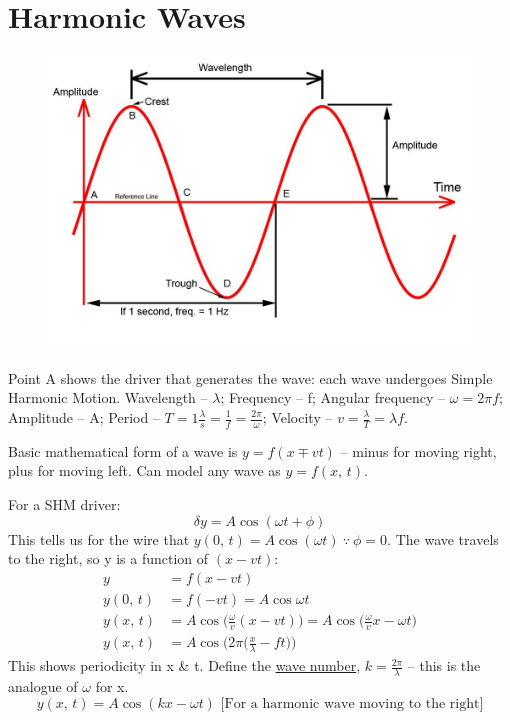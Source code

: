 \documentclass[a4paper, 11pt, normalem]{report}
\begin{document}
\section{Harmonic Waves}
\begin{figure}[H]
    \centering
    \includegraphics[scale=0.3]{Sine.jpg}
\end{figure}
Point A shows the driver that generates the wave: each wave undergoes Simple Harmonic Motion.
Wavelength -- $\lambda$; Frequency -- f; Angular frequency -- $\omega = 2{\pi}f$; Amplitude -- A; Period -- $T = 1 \frac{\lambda}{s} = \frac{1}{f} = \frac{2\pi}{\omega}$; Velocity -- $v = \frac{\lambda}{T} = {\lambda}f$.

Basic mathematical form of a wave is $y = f(x \mp vt)$ -- minus for moving right, plus for moving left.
Can model any wave as $y = f(x,\,t)$.

For a SHM driver:
\begin{equation}
    {\delta}y = A\cos{({\omega}t + \phi)}
\end{equation}
This tells us for the wire that $y(0,\,t) = A\cos{({\omega}t)} ~\because~ \phi = 0$.
The wave travels to the right, so y is a function of $(x-vt)$:
\begin{align}
    y &= f(x-vt) \\
    y(0,\,t) &= f(-vt) = A\cos{{\omega}t} \\
    y(x,\,t) &= A\cos{\Big(\frac{\omega}{v}(x-vt)\Big)} = A\cos{\Big(\frac{\omega}{v}x - {\omega}t\Big)} \\
    y(x,\,t) &= A\cos{\Big(2\pi\Big(\frac{x}{\lambda} - ft\Big)\Big)}
\end{align}
This shows periodicity in x \& t.
Define the \underline{wave number}, $k = \frac{2\pi}{\lambda}$ -- this is the analogue of $\omega$ for x.
\begin{equation}
    y(x,\,t) = A\cos{(kx - {\omega}t)} \text{ [For a harmonic wave moving to the right]}
\end{equation}
\end{document}
